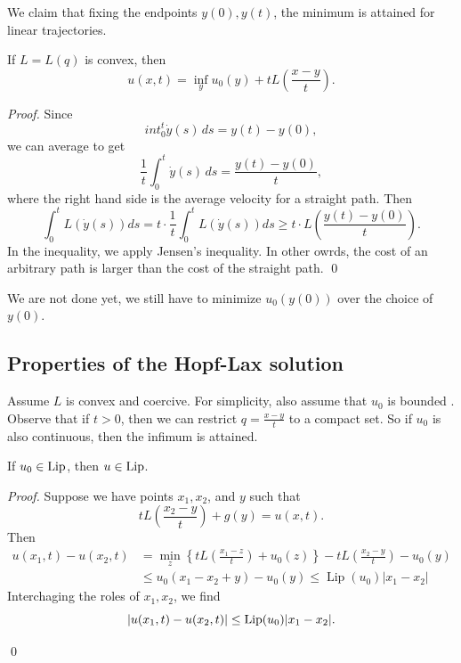 We claim that fixing the endpoints $y(0), y(t)$, the minimum is attained for linear trajectories.

\begin{theorem}
     If $L=L(q)$ is convex, then 
    \[
        u(x, t)=\inf _{y} u_{0}(y)+t L\left(\frac{x-y}{t}\right).
    \]
\end{theorem}
\begin{proof}
    Since 
    \[
        int_0^t \dot y(s) \,ds = y(t) - y(0),
    \]
    we can average to get 
    \[
        \frac 1 t \int_0^t \dot y(s) \, ds = \frac{y(t)- y(0)}{t},
    \]
    where the right hand side is the average velocity for a straight path. Then 
    \[
        \int_0^t L(\dot y(s)) ds = t\cdot \frac{1}{t}\int_0^t L(\dot y(s)) ds \ge t \cdot L(\frac{y(t) -y(0)}{t}).
    \]
    In the inequality, we apply Jensen's inequality. In other owrds, the cost of an arbitrary path is larger than the cost of the straight path. 
    \qed 
\end{proof}
We are not done yet, we still have to minimize $u_0(y(0))$ over the choice of $y(0)$.

\subsection{Properties of the Hopf-Lax solution}
Assume $L$ is convex and coercive. For simplicity, also assume that $u_0$ is bounded . Observe that if $t>0$, then we can restrict $q = \frac{x-y}{t}$ to a compact set. So if $u_0$ is also continuous, then the infimum is attained.

\begin{proposition}
    If $u_0\in \operatorname{Lip}$, then $u \in \operatorname{Lip}$.
\end{proposition}

\begin{proof}
    Suppose we have points $x_1, x_2$, and $y$ such that 
    \[
        tL(\frac{x_2-y}{t})+g(y) = u(x,t).
    \]
    Then 
    \[
        \begin{aligned}
            u(x_1, t)-u(x_2, t) &=\min _{z}\left\{t L\left(\frac{x_1-z}{t}\right)+u_0(z)\right\}-t L\left(\frac{x_2-y}{t}\right)-u_0(y) \\
            & \leq u_0(x_1-x_2+y)-u_0(y) \leq \operatorname{Lip}(u_0)|x_1-x_2|
            \end{aligned}
    \]
    Interchaging the roles of $x_1,x_2$, we find 
    \[
        |u(x_1,t) - u(x_2, t) | \le \operatorname{Lip}(u_0)|x_1-x_2|.
    \]

    \qed 
\end{proof}

